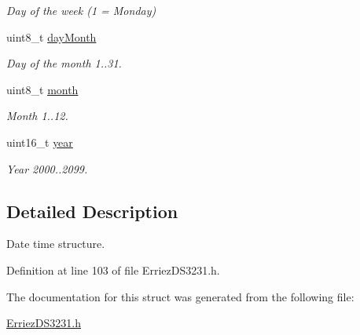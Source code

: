 \begin{DoxyCompactItemize}
\begin{DoxyCompactList}\small\item\em Day of the week (1 = Monday) \end{DoxyCompactList}\item 
uint8\+\_\+t \hyperlink{struct_d_s3231___date_time__s_a8b56b99decfd2f8d57ad7adba7e699bf}{day\+Month}\hypertarget{struct_d_s3231___date_time__s_a8b56b99decfd2f8d57ad7adba7e699bf}{}\label{struct_d_s3231___date_time__s_a8b56b99decfd2f8d57ad7adba7e699bf}

\begin{DoxyCompactList}\small\item\em Day of the month 1..31. \end{DoxyCompactList}\item 
uint8\+\_\+t \hyperlink{struct_d_s3231___date_time__s_aa4cd33d1ad2cc42f108386cefa73c218}{month}\hypertarget{struct_d_s3231___date_time__s_aa4cd33d1ad2cc42f108386cefa73c218}{}\label{struct_d_s3231___date_time__s_aa4cd33d1ad2cc42f108386cefa73c218}

\begin{DoxyCompactList}\small\item\em Month 1..12. \end{DoxyCompactList}\item 
uint16\+\_\+t \hyperlink{struct_d_s3231___date_time__s_a30275fe546bc83d3fe9a565a39fccc04}{year}\hypertarget{struct_d_s3231___date_time__s_a30275fe546bc83d3fe9a565a39fccc04}{}\label{struct_d_s3231___date_time__s_a30275fe546bc83d3fe9a565a39fccc04}

\begin{DoxyCompactList}\small\item\em Year 2000..2099. \end{DoxyCompactList}\end{DoxyCompactItemize}


\subsection{Detailed Description}
Date time structure. 

Definition at line 103 of file Erriez\+D\+S3231.\+h.



The documentation for this struct was generated from the following file\+:\begin{DoxyCompactItemize}
\item 
\hyperlink{_erriez_d_s3231_8h}{Erriez\+D\+S3231.\+h}\end{DoxyCompactItemize}

